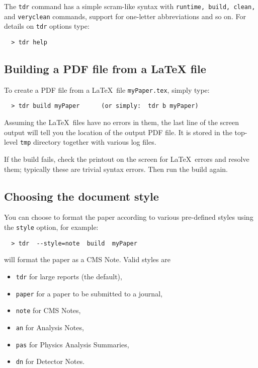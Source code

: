 The \texttt{tdr} command has a simple scram-like syntax with
\texttt{runtime, build, clean,} and \texttt{veryclean} commands,
support for one-letter abbreviations and so on.
For details on \texttt{tdr} options type:
%
\vspace*{-2.5ex}\begin{verbatim}
  > tdr help
\end{verbatim}
\subsection{Building a PDF file from a \texorpdfstring{\LaTeX}{LaTeX} file}
%
To create a PDF file from a \LaTeX\ file \texttt{myPaper.tex}, simply type:
%
\vspace*{-2.5ex}\begin{verbatim}
  > tdr build myPaper      (or simply:  tdr b myPaper)
\end{verbatim}
%
Assuming the \LaTeX\ files have no errors in them, the last line of the
screen output will tell you the location of the output PDF file.
It is stored in the top-level \texttt{tmp} directory together
with various log files.

If the build fails, check the printout on the screen for \LaTeX\ errors
and resolve them; typically these are trivial syntax errors.
Then run the build again.
\subsection{Choosing the document style}
%
You can choose to format the paper according to various pre-defined
styles using the \texttt{style} option, for example:
%
\vspace*{-2.5ex}\begin{verbatim}
  > tdr  --style=note  build  myPaper
\end{verbatim}
%
will format the paper as a CMS Note.
Valid styles are
\begin{itemize}
\item \texttt{tdr}  for large reports (the default),
\item \texttt{paper} for a paper to be submitted to a journal,
\item \texttt{note} for CMS Notes,
\item \texttt{an}   for Analysis Notes,
\item \texttt{pas}  for Physics Analysis Summaries,
\item \texttt{dn}   for Detector Notes.
\end{itemize}

